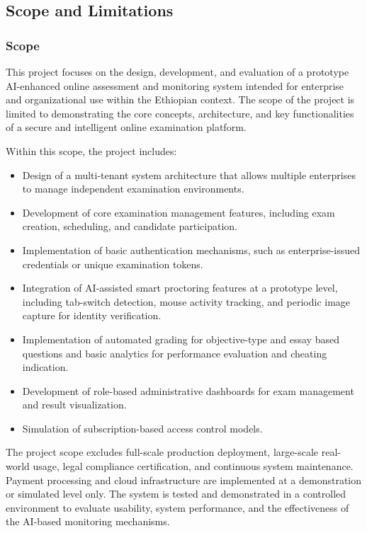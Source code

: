 \subsection{Scope and Limitations}
\subsubsection{Scope}
This project focuses on the design, development, and evaluation of a prototype AI-enhanced online assessment and monitoring system intended for enterprise and organizational use within the Ethiopian context. The scope of the project is limited to demonstrating the core concepts, architecture, and key functionalities of a secure and intelligent online examination platform.

Within this scope, the project includes:

\begin{sloppypar}
\begin{itemize}
    \item Design of a multi-tenant system architecture that allows multiple enterprises to manage independent examination environments.
    \item Development of core examination management features, including exam creation, scheduling, and candidate participation.
    \item Implementation of basic authentication mechanisms, such as enterprise-issued credentials or unique examination tokens.
    \item Integration of AI-assisted smart proctoring features at a prototype level, including tab-switch detection, mouse activity tracking, and periodic image capture for identity verification.
    \item Implementation of automated grading for objective-type and essay based questions and basic analytics for performance evaluation and cheating indication.
    \item Development of role-based administrative dashboards for exam management and result visualization.
    \item Simulation of subscription-based access control models.
\end{itemize}
\end{sloppypar}
The project scope excludes full-scale production deployment, large-scale real-world usage, legal compliance certification, and continuous system maintenance. Payment processing and cloud infrastructure are implemented at a demonstration or simulated level only. The system is tested and demonstrated in a controlled environment to evaluate usability, system performance, and the effectiveness of the AI-based monitoring mechanisms.


